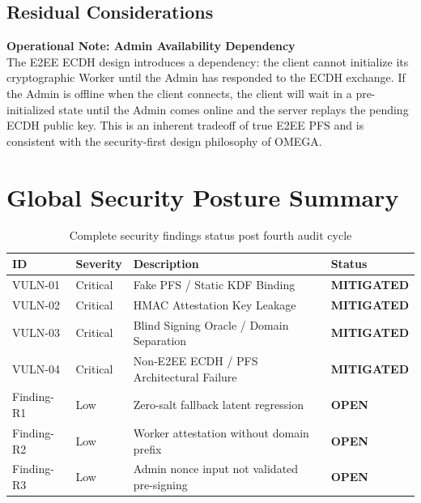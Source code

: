 \documentclass[12pt,a4paper]{article}
\begin{document}
\subsection{Residual Considerations}

\begin{warningbox}
\textbf{Operational Note: Admin Availability Dependency}\\
The E2EE ECDH design introduces a dependency: the client cannot initialize its cryptographic Worker until the Admin has responded to the ECDH exchange. If the Admin is offline when the client connects, the client will wait in a pre-initialized state until the Admin comes online and the server replays the pending ECDH public key. This is an inherent tradeoff of true E2EE PFS and is consistent with the security-first design philosophy of OMEGA.
\end{warningbox}

\section{Global Security Posture Summary}

\begin{table}[h!]
\centering
\begin{tabularx}{\textwidth}{llXl}
\toprule
\textbf{ID} & \textbf{Severity} & \textbf{Description} & \textbf{Status} \\
\midrule
VULN-01 & Critical & Fake PFS / Static KDF Binding & \textcolor{safegreen}{\textbf{MITIGATED}} \\
VULN-02 & Critical & HMAC Attestation Key Leakage & \textcolor{safegreen}{\textbf{MITIGATED}} \\
VULN-03 & Critical & Blind Signing Oracle / Domain Separation & \textcolor{safegreen}{\textbf{MITIGATED}} \\
VULN-04 & Critical & Non-E2EE ECDH / PFS Architectural Failure & \textcolor{safegreen}{\textbf{MITIGATED}} \\
Finding-R1 & Low & Zero-salt fallback latent regression & \textcolor{warningyellow}{\textbf{OPEN}} \\
Finding-R2 & Low & Worker attestation without domain prefix & \textcolor{warningyellow}{\textbf{OPEN}} \\
Finding-R3 & Low & Admin nonce input not validated pre-signing & \textcolor{warningyellow}{\textbf{OPEN}} \\
\bottomrule
\end{tabularx}
\caption{Complete security findings status post fourth audit cycle}
\end{table}
\end{document}

